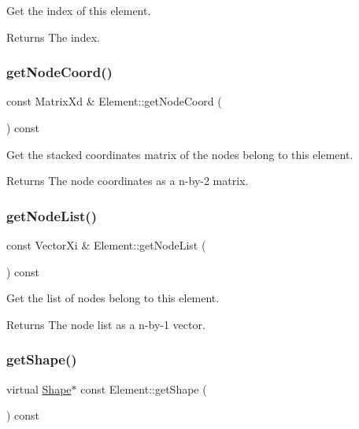 Get the index of this element. 

\begin{DoxyReturn}{Returns}
The index. 
\end{DoxyReturn}
\mbox{\label{class_element_a4d12b24e62592a1456e04d15872d5240}} 
\subsubsection{\texorpdfstring{get\+Node\+Coord()}{getNodeCoord()}}
{\footnotesize\ttfamily const Matrix\+Xd \& Element\+::get\+Node\+Coord (\begin{DoxyParamCaption}{ }\end{DoxyParamCaption}) const}



Get the stacked coordinates matrix of the nodes belong to this element. 

\begin{DoxyReturn}{Returns}
The node coordinates as a n-\/by-\/2 matrix. 
\end{DoxyReturn}
\mbox{\label{class_element_a763e0e4a46e68823903557a605dc5474}} 
\subsubsection{\texorpdfstring{get\+Node\+List()}{getNodeList()}}
{\footnotesize\ttfamily const Vector\+Xi \& Element\+::get\+Node\+List (\begin{DoxyParamCaption}{ }\end{DoxyParamCaption}) const}



Get the list of nodes belong to this element. 

\begin{DoxyReturn}{Returns}
The node list as a n-\/by-\/1 vector. 
\end{DoxyReturn}
\mbox{\label{class_element_a54c5c297abff4ac3abacd815342a9645}} 
\subsubsection{\texorpdfstring{get\+Shape()}{getShape()}}
{\footnotesize\ttfamily virtual \mbox{\hyperlink{class_shape}{Shape}}$\ast$ const Element\+::get\+Shape (\begin{DoxyParamCaption}{ }\end{DoxyParamCaption}) const\hspace{0.3cm}{\ttfamily [pure virtual]}}



